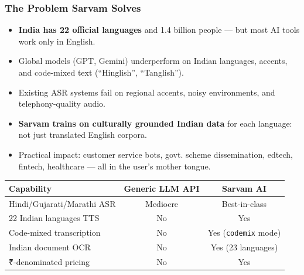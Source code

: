 \begin{frame}[fragile]\frametitle{The Problem Sarvam Solves}
  \begin{itemize}
    \item \textbf{India has 22 official languages} and 1.4 billion people --- but most AI tools work only in English.
    \item Global models (GPT, Gemini) underperform on Indian languages, accents, and code-mixed text (``Hinglish'', ``Tanglish'').
    \item Existing ASR systems fail on regional accents, noisy environments, and telephony-quality audio.
    \item \textbf{Sarvam trains on culturally grounded Indian data} for each language: not just translated English corpora.
    \item Practical impact: customer service bots, govt. scheme dissemination, edtech, fintech, healthcare --- all in the user's mother tongue.
  \end{itemize}
\begin{center}
\begin{tabular}{|l|c|c|}
\hline
\textbf{Capability} & \textbf{Generic LLM API} & \textbf{Sarvam AI} \\
\hline
Hindi/Gujarati/Marathi ASR & Mediocre & Best-in-class \\
22 Indian languages TTS & No & Yes \\
Code-mixed transcription & No & Yes (\texttt{codemix} mode) \\
Indian document OCR & No & Yes (23 languages) \\
₹-denominated pricing & No & Yes \\
\hline
\end{tabular}
\end{center}
\end{frame}

